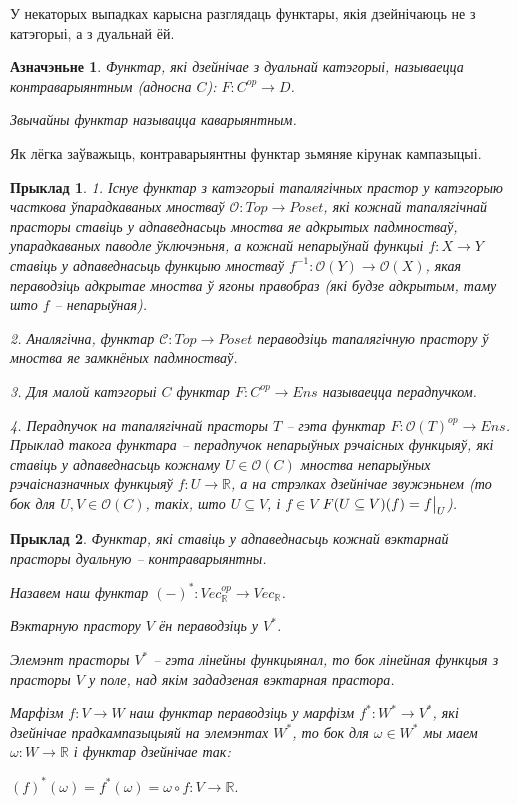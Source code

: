 \documentclass[a4paper,12pt]{book}
\newtheorem{example}{Прыклад}[section]
\newtheorem{definition}{Азначэньне}[section]
\newcommand\restr[2]{{%
    \left.\kern-\nulldelimiterspace %
    #1 %
    \vphantom{\big|} %
    \right|_{#2} %
}}
\begin{document}
У некаторых выпадках карысна разглядаць функтары, якія дзейнічаюць не
з катэгорыі, а з дуальнай ёй.

\begin{definition}
  Функтар, які дзейнічае з дуальнай катэгорыі, называецца
  контраварыянтным (адносна $C$): $F: C^{op} \rightarrow D$.

  Звычайны функтар называцца каварыянтным.
\end{definition}

Як лёгка заўважыць, контраварыянтны функтар зьмяняе кірунак
кампазыцыі.

\begin{example}
  1. Існуе функтар з катэгорыі тапалягічных прастор у катэгорыю часткова
  ўпарадкаваных мностваў $\mathcal{O}: Top \rightarrow Poset$, які
  кожнай тапалягічнай прасторы ставіць у адпаведнасьць мноства яе
  адкрытых падмностваў, упарадкаваных паводле ўключэньня, а кожнай
  непарыўнай функцыі $f: X \rightarrow Y$ ставіць у адпаведнасьць
  функцыю мностваў $f^{-1}: \mathcal{O}(Y) \rightarrow
  \mathcal{O}(X)$, якая пераводзіць адкрытае мноства ў ягоны правобраз
  (які будзе адкрытым, таму што $f$ -- непарыўная).

  2. Аналягічна, функтар $\mathcal{C}: Top \rightarrow Poset$
  пераводзіць тапалягічную прастору ў мноства яе замкнёных
  падмностваў.

  3. Для малой катэгорыі $C$ функтар $F: C^{op} \rightarrow Ens$
  называецца перадпучком.

  4. Перадпучок на тапалягічнай прасторы $T$ -- гэта функтар $F:
  \mathcal{O}(T)^{op} \rightarrow Ens$. Прыклад такога функтара --
  перадпучок непарыўных рэчаісных функцыяў, які ставіць у
  адпаведнасьць кожнаму $U \in \mathcal{O}(C)$ мноства непарыўных
  рэчаісназначных функцыяў $f: U \rightarrow \mathbb{R}$, а на
  стрэлках дзейнічае звужэньнем (то бок для $U, V \in \mathcal{O}(C)$,
  такіх, што $U \subseteq V$, і $f \in V$ $F(U \subseteq V)(f) =
  \restr{f}{U}$).
\end{example}

\begin{example}
  Функтар, які ставіць у адпаведнасьць кожнай вэктарнай прасторы
  дуальную --
  контраварыянтны.

  Назавем наш функтар $(-)^*: Vec_{\mathbb{R}}^{op} \rightarrow Vec_{\mathbb{R}}$.

  Вэктарную прастору $V$ ён пераводзіць у $V^*$.

  Элемэнт прасторы $V^*$ -- гэта лінейны функцыянал, то бок лінейная
  функцыя з прасторы $V$ у поле, над якім зададзеная вэктарная прастора.

  Марфізм $f: V \rightarrow W$ наш функтар пераводзіць у марфізм $f^*:
  W^* \rightarrow V^*$, які дзейнічае прадкампазыцыяй на элемэнтах
  $W^*$, то бок для $\omega \in W^*$ мы маем $\omega: W \rightarrow
  \mathbb{R}$ і функтар дзейнічае так:

  $(f)^*(\omega) = f^*(\omega) = \omega \circ f: V \rightarrow
  \mathbb{R}.$
\end{example}
\end{document}
